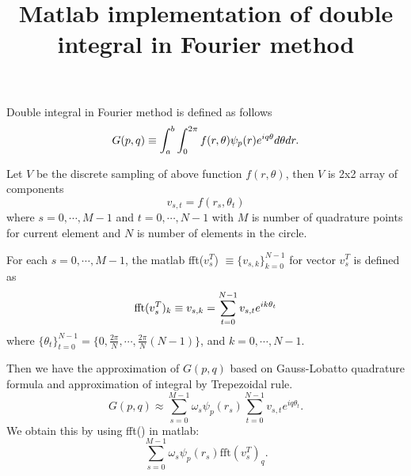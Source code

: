 \documentclass[11pt,letterpaper]{article}
\begin{document}
\title{{\bfseries Matlab implementation of double integral in Fourier method}
}






%

Double integral in Fourier method is defined as follows
\begin{equation}
G(p,q) \equiv \int_a^b \int_0^{2\pi} f(r, \theta) \psi_p(r)
e^{iq\theta} d\theta dr.
\\
\end{equation}

Let $V$ be the discrete sampling of above function $f(r, \theta)$,
then $V$ is 2x2 array of components
\begin{equation}
v_{s,t} = f(r_s, \theta_t)
\end{equation}
where $s = 0, \cdots, M-1$ and $t=0, \cdots, N-1$ with $M$ is
number of quadrature points for current element and $N$ is number
of elements in the circle.

For each $s = 0, \cdots, M-1$, the matlab fft($v_s^T$) $\equiv
\{v_{s,k}\}_{k=0}^{N-1}$ for vector $v_s^T$ is defined as
\begin{equation}
\mbox{fft}(v_s^T)_k \equiv v_{s,k} = \sum_{t=0}^{N-1} v_{s,t} e^{ik\theta_t} \\
\end{equation}
where $\{\theta_t\}_{t = 0}^{N-1} = \{0, \frac{2\pi}{N}, \cdots,
\frac{2\pi}{N}(N-1)\}$, and $k = 0, \cdots, N-1$.

Then we have the approximation of $G(p,q)$ based on Gauss-Lobatto
quadrature formula and approximation of integral by Trepezoidal
rule.
\begin{equation}
G(p, q) \approx \sum_{s=0}^{M-1} \omega_s \psi_p(r_s)
\sum_{t=0}^{N-1} v_{s,t} e^{iq\theta_t}.
\end{equation}
We obtain this by using fft() in matlab:
\begin{equation}
\sum_{s=0}^{M-1} \omega_s \psi_p(r_s) \mbox{fft}(v^T_{s})_q.
\end{equation}
\end{document}
